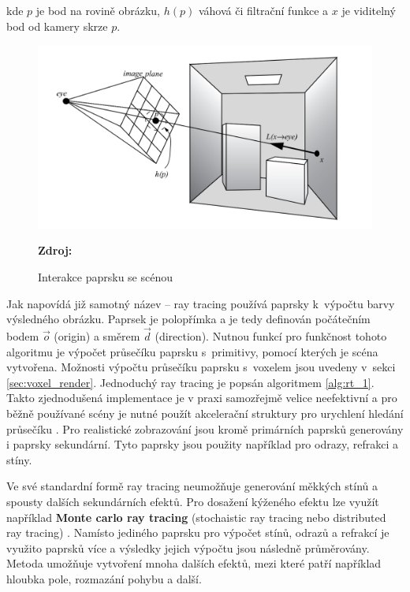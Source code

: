 kde $p$ je bod na rovině obrázku, $h(p)$ váhová či filtrační funkce a $x$ je viditelný bod od kamery skrze $p$.

\begin{figure}[H]
	\centering
	\includegraphics[scale=1]{obrazky-figures/ray_tracing_plane.png}
	\caption{Interakce paprsku se scénou}
	\textbf{Zdroj: \cite{advanced_global}}
	\label{fig:3d_grid}
\end{figure}


Jak napovídá již samotný název – ray tracing používá paprsky k~výpočtu barvy výsledného obrázku. Paprsek je polopřímka a je tedy definován počátečním bodem $\Vec{o}$ (origin) a směrem $\Vec{d}$ (direction). Nutnou funkcí pro funkčnost tohoto algoritmu je výpočet průsečíku paprsku s~primitivy, pomocí kterých je scéna vytvořena. Možnosti výpočtu průsečíku paprsku s~voxelem jsou uvedeny v~sekci \ref{sec:voxel_render}. Jednoduchý ray tracing je popsán algoritmem \ref{alg:rt_1}. Takto zjednodušená implementace je v praxi samozřejmě velice neefektivní a pro běžně používané scény je nutné použít akcelerační struktury pro urychlení hledání průsečíku \cite{accelerated_rt}. Pro realistické zobrazování jsou kromě primárních paprsků generovány i paprsky sekundární. Tyto paprsky jsou použity například pro odrazy, refrakci a stíny.

Ve své standardní formě ray tracing neumožňuje generování měkkých stínů a spousty dalších sekundárních efektů.  Pro dosažení kýženého efektu lze využít například \textbf{Monte carlo ray tracing} (stochaistic ray tracing nebo distributed ray tracing) \cite{distributed_rt}. Namísto jediného paprsku pro výpočet stínů, odrazů a refrakcí je využito paprsků více a výsledky jejich výpočtu jsou následně průměrovány. Metoda umožňuje vytvoření mnoha dalších efektů, mezi které patří například hloubka pole, rozmazání pohybu a další.

